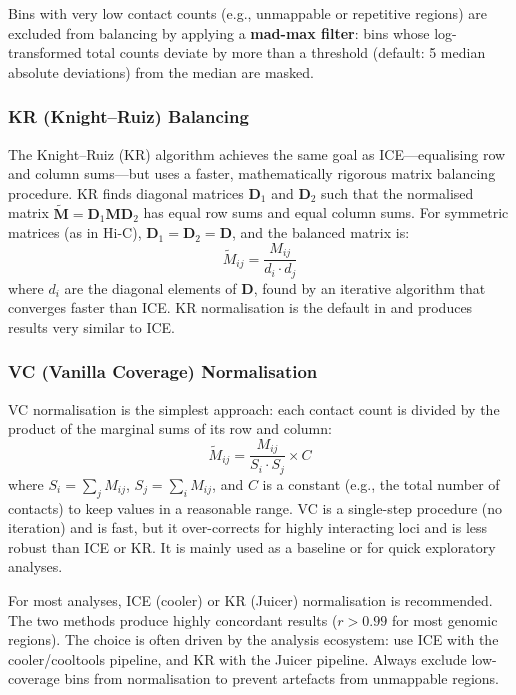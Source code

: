 Bins with very low contact counts (e.g., unmappable or repetitive regions) are excluded from balancing by applying a \textbf{mad-max filter}: bins whose log-transformed total counts deviate by more than a threshold (default: 5 median absolute deviations) from the median are masked.

\subsubsection{KR (Knight--Ruiz) Balancing}
\label{subsubsec:3dgenome:kr}

The Knight--Ruiz (KR) algorithm achieves the same goal as ICE---equalising row and column sums---but uses a faster, mathematically rigorous matrix balancing procedure. KR finds diagonal matrices $\mathbf{D}_1$ and $\mathbf{D}_2$ such that the normalised matrix $\tilde{\mathbf{M}} = \mathbf{D}_1 \mathbf{M} \mathbf{D}_2$ has equal row sums and equal column sums. For symmetric matrices (as in Hi-C), $\mathbf{D}_1 = \mathbf{D}_2 = \mathbf{D}$, and the balanced matrix is:
\begin{equation}
\label{eq:3dgenome:kr}
\tilde{M}_{ij} = \frac{M_{ij}}{d_i \cdot d_j}
\end{equation}
where $d_i$ are the diagonal elements of $\mathbf{D}$, found by an iterative algorithm that converges faster than ICE. KR normalisation is the default in  and produces results very similar to ICE.

\subsubsection{VC (Vanilla Coverage) Normalisation}
\label{subsubsec:3dgenome:vc}

VC normalisation is the simplest approach: each contact count is divided by the product of the marginal sums of its row and column:
\begin{equation}
\label{eq:3dgenome:vc}
\tilde{M}_{ij} = \frac{M_{ij}}{S_i \cdot S_j} \times C
\end{equation}
where $S_i = \sum_j M_{ij}$, $S_j = \sum_i M_{ij}$, and $C$ is a constant (e.g., the total number of contacts) to keep values in a reasonable range. VC is a single-step procedure (no iteration) and is fast, but it over-corrects for highly interacting loci and is less robust than ICE or KR. It is mainly used as a baseline or for quick exploratory analyses.

\begin{tipbox}
For most analyses, ICE (cooler) or KR (Juicer) normalisation is recommended. The two methods produce highly concordant results ($r > 0.99$ for most genomic regions). The choice is often driven by the analysis ecosystem: use ICE with the cooler/cooltools pipeline, and KR with the Juicer pipeline. Always exclude low-coverage bins from normalisation to prevent artefacts from unmappable regions.
\end{tipbox}

